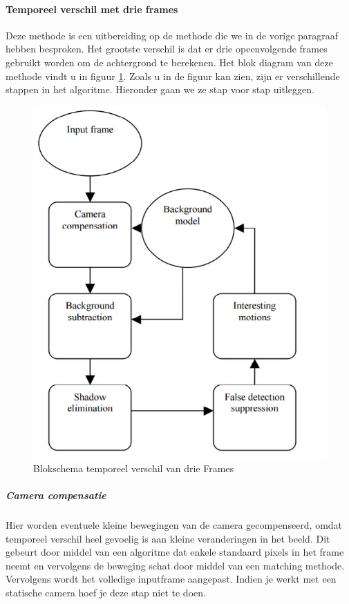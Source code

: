 \paragraph{Temporeel verschil met drie frames}
Deze methode is een uitbereiding op de methode die we in de vorige paragraaf hebben besproken. Het grootste verschil is dat er drie opeenvolgende frames gebruikt worden om de achtergrond te berekenen. Het blok diagram van deze methode vindt u in figuur \ref{imgTeV}. 
Zoals u in de figuur kan zien, zijn er verschillende stappen in het algoritme. Hieronder gaan we ze stap voor stap uitleggen.
\begin{figure}[h]
	\includegraphics[scale=0.6]{TemporeelVerschilDrieFrames}
	\caption{Blokschema temporeel verschil van drie Frames}
	\label{imgTeV}
\end{figure}

\subparagraph{Camera compensatie}
Hier worden eventuele kleine bewegingen van de camera gecompenseerd, omdat temporeel verschil heel gevoelig is aan kleine veranderingen in het beeld. Dit gebeurt door middel van een algoritme dat enkele standaard pixels in het frame neemt en vervolgens de beweging schat door middel van een matching methode. Vervolgens wordt het volledige inputframe aangepast.  Indien je werkt met een statische camera hoef je deze stap niet te doen.

